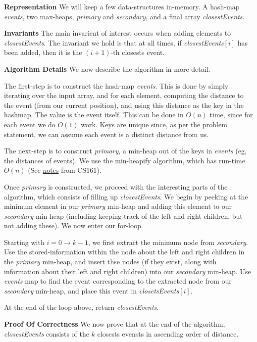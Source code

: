 \documentclass[12pt]{exam}
\newcommand*{\bigo}[1]{O \left( #1 \right)}
\begin{document}
\begin{questions}
\begin{solution}
\textbf{Representation}
We will keep a few data-structures in-memory. A hash-map \textit{events}, two max-heaps, \textit{primary} and \textit{secondary}, and a final array \textit{closestEvents}.

\textbf{Invariants}
The main invarient of interest occurs when adding elements to \textit{closestEvents}. The invariant we hold is that at all times, if \textit{closestEvents}$[i]$ has been added, then it is the $(i+1)$-th closests event. 

\textbf{Algorithm Details}
We now describe the algorithm in more detail.

The first-step is to construct the hash-map \textit{events}. This is done by simply iterating over the input array, and for each element, computing the distance to the event (from our current position), and using this distance as the key in the hashmap. The value is the event itself. This can be done in $\bigo{n}$ time, since for each event we do $\bigo{1}$ work. Keys are unique since, as per the problem statement, we can assume each event is a distinct distance from us.

The next-step is to construct \textit{primary}, a min-heap out of the keys in \textit{events} (eg, the distances of events). We use the min-heapify algorithm, which has run-time $\bigo{n}$ (See \href{https://web.stanford.edu/class/archive/cs/cs161/cs161.1168/lecture4.pdf}{notes} from CS161).

Once \textit{primary} is constructed, we proceed with the interesting parts of the algorithm, which consists of filling up \textit{closestEvents}. We begin by peeking at the minimum element in our \textit{primary} min-heap and adding this element to our \textit{secondary} min-heap (including keeping track of the left and right children, but not adding these). We now enter our for-loop.

Starting with $i = 0 \to k - 1$, we first extract the minimum node from \textit{secondary}. Use the stored-information within the node about the left and right children in the \textit{primary} min-heap, and insert thse nodes (if they exist, along with information about their left and right children) into our \textit{secondary} min-heap. Use \textit{events} map to find the event corresponding to the extracted node from our \textit{secondary} min-heap, and place this event in \textit{closetsEvents}$[i]$.

At the end of the loop above, return \textit{closestEvents}.

\textbf{Proof Of Correctness}
We now prove that at the end of the algorithm, \textit{closestEvents} consists of the $k$ closests evensts in ascending order of distance. 


\end{solution}
\end{questions}
\end{document}

